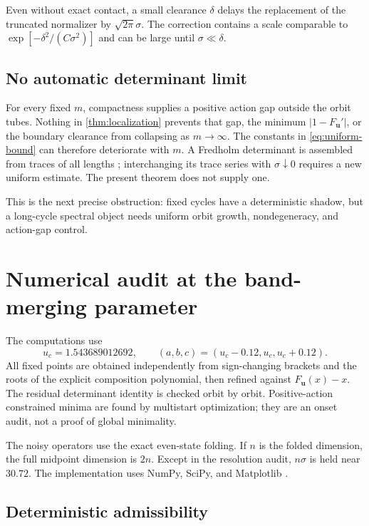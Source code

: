 \documentclass[11pt]{article}
\theoremstyle{remark}
\newcommand{\bu}{\boldsymbol u}
\begin{document}
Even without exact contact, a small clearance $\delta$ delays the replacement
of the truncated normalizer by $\sqrt{2\pi}\sigma$.  The correction contains
a scale comparable to $\exp[-\delta^2/(C\sigma^2)]$ and can be large until
$\sigma\ll\delta$.

\subsection{No automatic determinant limit}

For every fixed $m$, compactness supplies a positive action gap outside the
orbit tubes.  Nothing in \cref{thm:localization} prevents that gap, the minimum
$|1-F_{\bu}'|$, or the boundary clearance from collapsing as $m\to\infty$.
The constants in \eqref{eq:uniform-bound} can therefore deteriorate with
$m$.  A Fredholm determinant is assembled from traces of all lengths
\citep{Ruelle1976,Baladi2018,Bornemann2010}; interchanging its trace series
with $\sigma\downarrow0$ requires a new uniform estimate.  The present theorem
does not supply one.

This is the next precise obstruction: fixed cycles have a deterministic
shadow, but a long-cycle spectral object needs uniform orbit growth,
nondegeneracy, and action-gap control.

\section{Numerical audit at the band-merging parameter}
\label{sec:numerics}

The computations use
\begin{equation}
 u_c=1.543689012692,
 \qquad
 (a,b,c)=(u_c-0.12,u_c,u_c+0.12).
 \label{eq:numerical-parameters}
\end{equation}
All fixed points are obtained independently from sign-changing brackets and
the roots of the explicit composition polynomial, then refined against
$F_{\bu}(x)-x$.  The residual determinant identity is checked orbit by orbit.
Positive-action constrained minima are found by multistart optimization; they
are an onset audit, not a proof of global minimality.

The noisy operators use the exact even-state folding.  If $n$ is the folded
dimension, the full midpoint dimension is $2n$.  Except in the resolution
audit, $n\sigma$ is held near $30.72$.  The implementation uses
NumPy, SciPy, and Matplotlib \citep{HarrisEtAl2020,VirtanenEtAl2020,Hunter2007}.

\subsection{Deterministic admissibility}
\end{document}
